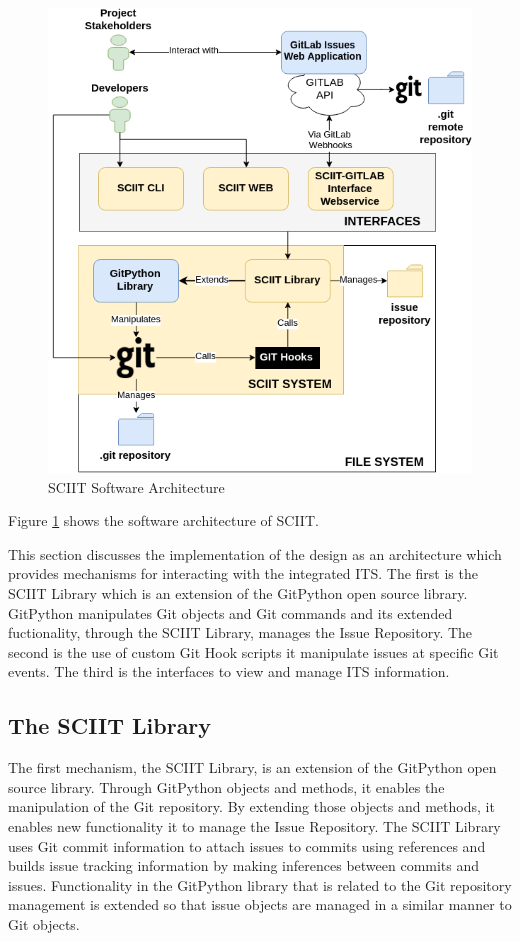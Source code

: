 \documentclass{mproj}
\begin{document}
\begin{figure}[h!]
\caption{SCIIT Software Architecture}
\label{fig:sciit-software-arch}
\centering
\includegraphics[width=12cm]{sciit-software-arch}
\end{figure}

Figure \ref{fig:sciit-software-arch} shows the software architecture of SCIIT. 

This section discusses the implementation of the design as an architecture which provides mechanisms for interacting with the integrated ITS. The first is the SCIIT Library which is an extension of the GitPython open source library. GitPython manipulates Git objects and Git commands and its extended fuctionality, through the SCIIT Library, manages the Issue Repository. The second is the use of custom Git Hook scripts it manipulate issues at specific Git events.  The third is the interfaces to view and manage ITS information.

\subsection{The SCIIT Library}

The first mechanism, the SCIIT Library, is an extension of the GitPython open source library. Through GitPython objects and methods, it enables the manipulation of the Git repository. By extending those objects and methods, it enables new functionality it to manage the Issue Repository. The SCIIT Library uses Git commit information to attach issues to commits using references and builds issue tracking information by making inferences between commits and issues. Functionality in the GitPython library that is related to the Git repository management is extended so that issue objects are managed in a similar manner to Git objects.
\end{document}

